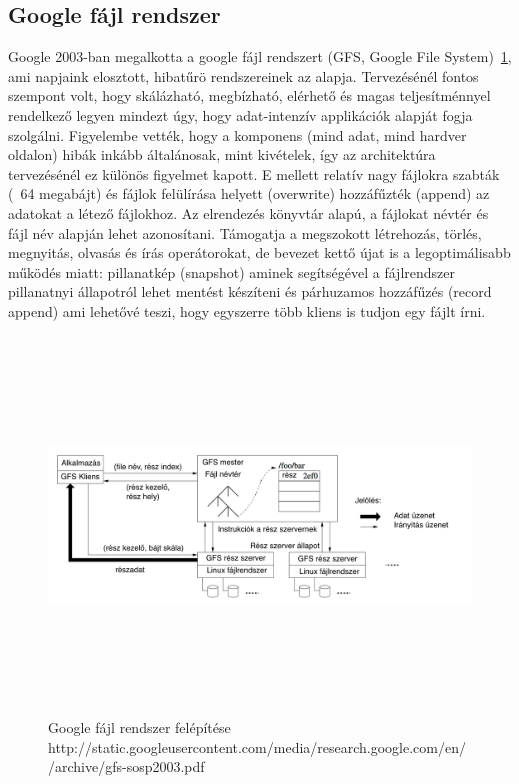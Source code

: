 \documentclass[a4paper,12pt]{article}
\begin{document}
\subsection{Google fájl rendszer}
Google 2003-ban megalkotta a google fájl rendszert (GFS, Google File System)~\ref{gfs}, ami napjaink elosztott, hibatűrö rendszereinek az alapja. Tervezésénél fontos szempont volt, hogy skálázható, megbízható, elérhető és magas teljesítménnyel rendelkező legyen mindezt úgy, hogy adat-intenzív applikációk alapját fogja szolgálni. Figyelembe vették, hogy a komponens (mind adat, mind hardver oldalon) hibák inkább általánosak, mint kivételek, így az architektúra tervezésénél ez különös figyelmet kapott. E mellett relatív nagy fájlokra szabták (~64 megabájt) és fájlok felülírása helyett (overwrite) 
hozzáfűzték (append) az adatokat a létező fájlokhoz. Az elrendezés könyvtár alapú, a fájlokat névtér és fájl név alapján lehet azonosítani. Támogatja a megszokott létrehozás, törlés, megnyitás, olvasás és írás operátorokat, de bevezet kettő újat is a legoptimálisabb működés miatt: pillanatkép (snapshot) aminek segítségével a fájlrendszer pillanatnyi állapotról lehet mentést készíteni és párhuzamos hozzáfűzés (record append) ami lehetővé teszi, hogy egyszerre több kliens is tudjon egy fájlt írni. 

\begin{figure}[ht!]
\centering
\includegraphics[width=130mm, height=100mm, keepaspectratio]{img/gfs.png}
\caption{Google fájl rendszer felépítése
http://static.googleusercontent.com/media/research.google.com/en//archive/gfs-sosp2003.pdf \label{gfs}}
\end{figure}
\end{document}
